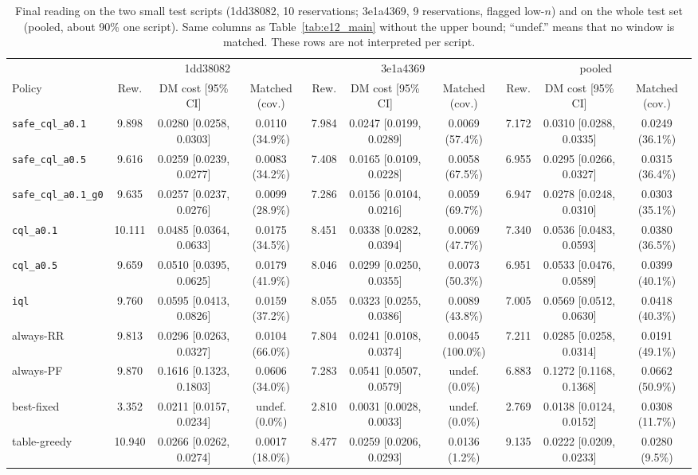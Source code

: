 \begin{table}[t]
\centering
\caption{Final reading on the two small test scripts (1dd38082, 10 reservations; 3e1a4369, 9 reservations, flagged low-$n$) and on the whole test set (pooled, about 90\% one script). Same columns as Table~\ref{tab:e12_main} without the upper bound; ``undef.'' means that no window is matched. These rows are not interpreted per script.}%
\label{tab:e12_other}
\scriptsize
\setlength{\tabcolsep}{3pt}
\begin{tabular}{l|ccc|ccc|ccc}
\hline
 & \multicolumn{3}{c|}{1dd38082} & \multicolumn{3}{c|}{3e1a4369} & \multicolumn{3}{c}{pooled} \\
Policy & Rew. & DM cost [95\% CI] & Matched (cov.) & Rew. & DM cost [95\% CI] & Matched (cov.) & Rew. & DM cost [95\% CI] & Matched (cov.) \\
\hline
\texttt{safe\_cql\_a0.1} & 9.898 & 0.0280 [0.0258, 0.0303] & 0.0110 (34.9\%) & 7.984 & 0.0247 [0.0199, 0.0289] & 0.0069 (57.4\%) & 7.172 & 0.0310 [0.0288, 0.0335] & 0.0249 (36.1\%) \\
\texttt{safe\_cql\_a0.5} & 9.616 & 0.0259 [0.0239, 0.0277] & 0.0083 (34.2\%) & 7.408 & 0.0165 [0.0109, 0.0228] & 0.0058 (67.5\%) & 6.955 & 0.0295 [0.0266, 0.0327] & 0.0315 (36.4\%) \\
\texttt{safe\_cql\_a0.1\_g0} & 9.635 & 0.0257 [0.0237, 0.0276] & 0.0099 (28.9\%) & 7.286 & 0.0156 [0.0104, 0.0216] & 0.0059 (69.7\%) & 6.947 & 0.0278 [0.0248, 0.0310] & 0.0303 (35.1\%) \\
\texttt{cql\_a0.1} & 10.111 & 0.0485 [0.0364, 0.0633] & 0.0175 (34.5\%) & 8.451 & 0.0338 [0.0282, 0.0394] & 0.0069 (47.7\%) & 7.340 & 0.0536 [0.0483, 0.0593] & 0.0380 (36.5\%) \\
\texttt{cql\_a0.5} & 9.659 & 0.0510 [0.0395, 0.0625] & 0.0179 (41.9\%) & 8.046 & 0.0299 [0.0250, 0.0355] & 0.0073 (50.3\%) & 6.951 & 0.0533 [0.0476, 0.0589] & 0.0399 (40.1\%) \\
\texttt{iql} & 9.760 & 0.0595 [0.0413, 0.0826] & 0.0159 (37.2\%) & 8.055 & 0.0323 [0.0255, 0.0386] & 0.0089 (43.8\%) & 7.005 & 0.0569 [0.0512, 0.0630] & 0.0418 (40.3\%) \\
always-RR & 9.813 & 0.0296 [0.0263, 0.0327] & 0.0104 (66.0\%) & 7.804 & 0.0241 [0.0108, 0.0374] & 0.0045 (100.0\%) & 7.211 & 0.0285 [0.0258, 0.0314] & 0.0191 (49.1\%) \\
always-PF & 9.870 & 0.1616 [0.1323, 0.1803] & 0.0606 (34.0\%) & 7.283 & 0.0541 [0.0507, 0.0579] & undef. (0.0\%) & 6.883 & 0.1272 [0.1168, 0.1368] & 0.0662 (50.9\%) \\
best-fixed & 3.352 & 0.0211 [0.0157, 0.0234] & undef. (0.0\%) & 2.810 & 0.0031 [0.0028, 0.0033] & undef. (0.0\%) & 2.769 & 0.0138 [0.0124, 0.0152] & 0.0308 (11.7\%) \\
table-greedy & 10.940 & 0.0266 [0.0262, 0.0274] & 0.0017 (18.0\%) & 8.477 & 0.0259 [0.0206, 0.0293] & 0.0136 (1.2\%) & 9.135 & 0.0222 [0.0209, 0.0233] & 0.0280 (9.5\%) \\
\hline
\end{tabular}
\end{table}

